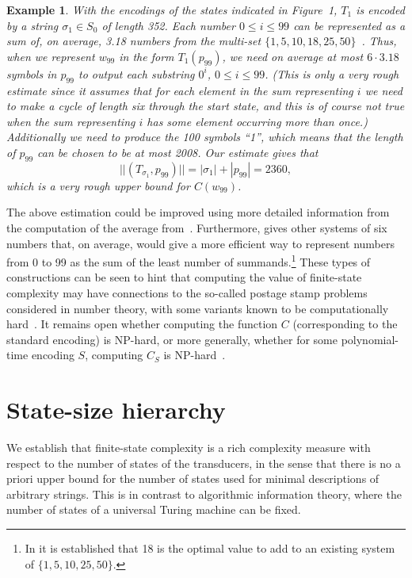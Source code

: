 \documentclass[copyright]{eptcs}
\newtheorem{example}{Example}[section]
\begin{document}
\begin{example}
{With the encodings of the states
indicated in  Figure~1, $T_1$ is encoded by a string $\sigma_1
\in S_0$ of length 352. 
Each number $0 \leq i \leq 99$ can be represented as a
sum of, on average, 3.18 numbers from the multi-set
$\{ 1, 5, 10, 18, 25, 50 \}$~\cite{Sh}. Thus, when we represent
$w_{99}$ in the form $T_1(p_{99})$, we need on average at most
$6 \cdot 3.18$ symbols in $p_{99}$ to output each substring
$0^i$, $0 \leq i \leq 99$. (This is only a very rough estimate
since it assumes that for each element in the sum representing $i$
we need to make a cycle of length six through the start state, and
this is of course not true when the sum representing $i$ has some
element occurring more than once.) Additionally we need to produce
the 100 symbols ``1'', which means that the length of $p_{99}$ can
be chosen to be at most 2008.
Our estimate gives that
$$||(T_{\sigma_1}, p_{99})|| =  |\sigma_1| + |p_{99}| = 2360,$$
which is  a very rough upper bound for $C(w_{99})$.}
\end{example}

The above estimation could 
be improved using more detailed information
from the computation of the average from~\cite{Sh}. Furthermore, 
\cite{Sh} gives other systems of six numbers that,
on average, would give a more efficient way to represent numbers from 0
to 99 as the sum of the least number
of summands.\footnote{In \cite{Sh} it is established
that 18 is the optimal value to add to an existing
system of $\{ 1, 5, 10,  25, 50 \}$.} These types of constructions
can be seen to hint that computing the value of finite-state complexity
may have connections to the so-called postage stamp problems considered
in number theory,
with some  variants known
to be computationally
hard~\cite{Gu,Sh2}. It remains open whether computing the function
$C$ (corresponding to the standard encoding) is NP-hard, 
or more generally, whether for
some polynomial-time encoding $S$, computing
$C_S$ is NP-hard~\cite{CSR}.  

\section{State-size hierarchy }
\label{statessize}

We establish that finite-state complexity is a rich complexity measure
with respect to the number of states of the transducers, in the
sense that there is no a priori upper bound for the number of states
used for minimal descriptions of arbitrary strings.
This is in contrast to algorithmic information theory,
where the number of states of a
universal Turing machine can be fixed.
\end{document}
